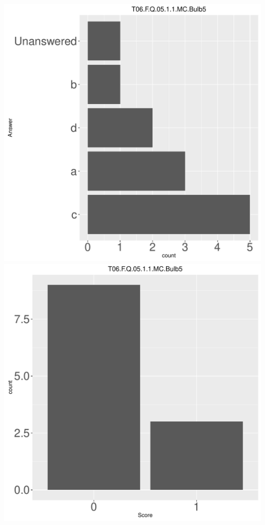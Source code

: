 \documentclass[12pt,english,nohyper]{tufte-handout}\usepackage[]{graphicx}\usepackage[]{color}
\begin{document}
\begin{center} \includegraphics[width=.45\linewidth]{Topic06_AB_66_answer} \includegraphics[width=.45\linewidth]{Topic06_AB_66_score} \end{center} 
\end{document}
